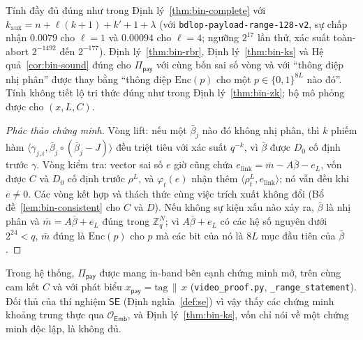 \begin{theorem}
\label{thm:pay}
Tính đầy đủ đúng như trong Định lý~\ref{thm:bin-complete} với
$k_{\mathrm{aux}}=n+\ell(k+1)+k'+1+\lambda$ (với
\texttt{bdlop-payload-range-128-v2}, sự chấp nhận $0.0079$ cho $\ell=1$ và
$0.00094$ cho $\ell=4$; ngưỡng $2^{17}$ lần thử, xác suất toàn-abort
$2^{-1492}$ đến $2^{-177}$). Định lý~\ref{thm:bin-rbr},
Định lý~\ref{thm:bin-ks} và Hệ quả~\ref{cor:bin-sound} đúng cho
$\Pi_{\mathsf{pay}}$ với cùng
bốn sai số vòng và với ``thông điệp nhị phân'' được thay bằng ``thông điệp
$\mathrm{Enc}(p)$ cho một $p\in\{0,1\}^{8L}$ nào đó''. Tính không tiết lộ tri
thức đúng như trong Định lý~\ref{thm:bin-zk}; bộ mô phỏng được cho $(x,L,C)$.
\end{theorem}
\begin{proof}[Phác thảo chứng minh]
Vòng lift: nếu một $\bar\beta_j$ nào đó không nhị phân, thì $k$ phiếm hàm
$\langle\gamma_{j,i},\bar\beta_j\circ(\bar\beta_j-J)\rangle$ đều triệt tiêu với
xác suất $q^{-k}$, vì $\bar\beta$ được $D_0$ cố định trước $\gamma$. Vòng kiểm
tra: vector sai số $e$ giờ cũng chứa
$e_{\mathrm{link}}=\bar m-A\bar\beta-e_L$, vốn được $C$ và $D_0$ cố định
trước $\rho^L$, và $\varphi_t(e)$ nhận thêm
$\langle\rho^L_t,e_{\mathrm{link}}\rangle$; nó vẫn đều khi $e\ne0$.
Các vòng kết hợp và thách thức cùng việc trích xuất không đổi
(Bổ đề~\ref{lem:bin-consistent} cho $C$ và $D$). Nếu không sự kiện xấu nào xảy
ra, $\bar\beta$ là nhị phân và $\bar m=A\bar\beta+e_L$ đúng trong $\mathbb Z_q^N$;
vì $A\bar\beta+e_L$ có các hệ số nguyên dưới $2^{24}<q$, $\bar m$ đúng là
$\mathrm{Enc}(p)$ cho $p$ mà các bit của nó là $8L$ mục đầu tiên
của $\bar\beta$.
\end{proof}

Trong hệ thống, $\Pi_{\mathsf{pay}}$ được mang in-band bên cạnh chứng minh mở,
trên cùng cam kết $C$ và với phát biểu $x_{\mathsf{pay}}=\text{tag}\,\|\,x$
(\texttt{video\_proof.py}, \texttt{\_range\_statement}). Đối thủ của thí
nghiệm $\mathsf{SE}$ (Định nghĩa~\ref{def:se}) vì vậy thấy các chứng minh khoảng
trung thực qua $\mathcal O_{\mathsf{Emb}}$, và Định lý~\ref{thm:bin-ks}, vốn chỉ
nói về một chứng minh độc lập, là không đủ.


